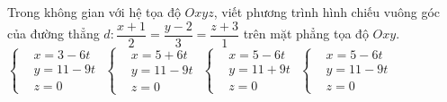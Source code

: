\begin{ex}%
Trong không gian với hệ tọa độ $Oxyz$, viết phương trình hình chiếu vuông góc của đường thẳng $d: \dfrac{x+1}{2}=\dfrac{y-2}{3}=\dfrac{z+3}{1}$ trên mặt phẳng tọa độ $Oxy$.
\choice 
{$\left \lbrace \begin{aligned} &x=3-6t\\ &y=11-9t \\&z=0   \end{aligned} \right.$}
{$\left \lbrace \begin{aligned} &x=5+6t\\ &y=11-9t \\&z=0   \end{aligned} \right.$}
{$\left \lbrace \begin{aligned} &x=5-6t\\ &y=11+9t \\&z=0   \end{aligned} \right.$}
{\True $\left \lbrace \begin{aligned} &x=5-6t\\ &y=11-9t \\&z=0   \end{aligned} \right.$}
\end{ex} 

